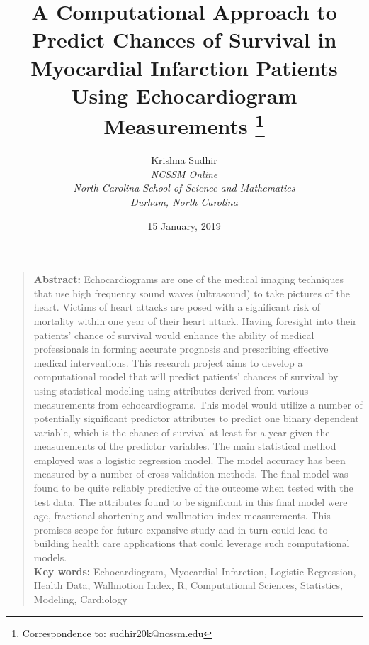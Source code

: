 \documentclass[11pt]{article}
\begin{document}

\title{A Computational Approach to Predict Chances of Survival in Myocardial Infarction Patients Using Echocardiogram Measurements
\thanks{
Correspondence to:  sudhir20k@ncssm.edu}
}


\author{Krishna Sudhir\\
{\it NCSSM Online}\\
{\it  North Carolina School of Science and Mathematics}\\
{\it Durham, North Carolina}\\
 }
\date{15 January, 2019}

\maketitle  %


\begin{quotation}
\textbf{Abstract:}  Echocardiograms are one of the medical imaging techniques that use high frequency sound waves (ultrasound) to take pictures of the heart. Victims of heart attacks are posed with a significant risk of mortality within one year of their heart attack. Having foresight into their patients' chance of survival would enhance the ability of medical professionals in forming accurate prognosis and prescribing effective medical interventions. This research project aims to develop a computational model that will predict patients’ chances of survival by using statistical modeling using attributes derived from various measurements from echocardiograms. This model would utilize a number of potentially significant predictor attributes to predict one binary dependent variable, which is the chance of survival at least for a year given the measurements of the predictor variables. The main statistical method employed was a logistic regression model. The model accuracy has been measured by a number of cross validation methods. The final model was found to be quite reliably predictive of the outcome when tested with the test data. The attributes found to be significant in this final model were age, fractional shortening and wallmotion-index measurements. This promises scope for future expansive study and in turn could lead to building health care applications that could leverage such computational models. \\


\textbf{Key words:} Echocardiogram, Myocardial Infarction, Logistic Regression, Health Data, Wallmotion Index, R, Computational Sciences, Statistics, Modeling, Cardiology

\end{quotation}
\end{document}
